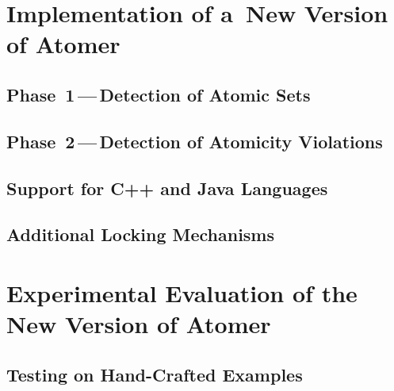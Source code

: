 

\chapter{Implementation of a~New Version of Atomer}
\label{chap:implement}



\section{\texorpdfstring{Phase~1\,---\,Detection of Atomic Sets}{Phase~1 - Detection of Atomic Sets}}
\label{sec:implementPhase1}


\section{\texorpdfstring{Phase~2\,---\,Detection of Atomicity Violations}{Phase~2 - Detection of Atomicity Violations}}
\label{sec:implementPhase2}


\section{Support for C++ and Java Languages}
\label{sec:implementLanguages}


\section{Additional Locking Mechanisms}
\label{sec:implementLocks}






\chapter{Experimental Evaluation of the New Version of Atomer}
\label{chap:exp}



\section{Testing on Hand-Crafted Examples}
\label{sec:expHand}


